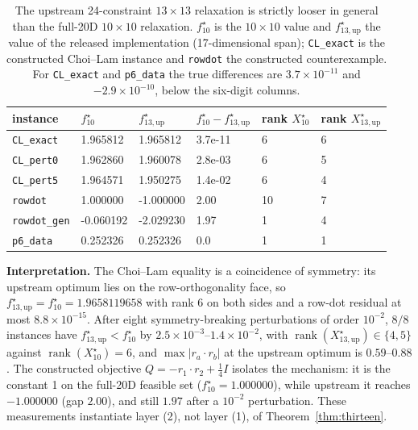 \begin{table}[t]
\centering
\caption{The upstream 24-constraint $13\times13$ relaxation is strictly looser in general than the full-20D $10\times10$ relaxation. $f^\star_{10}$ is the $10\times10$ value and $f^\star_{13,\mathrm{up}}$ the value of the released implementation (17-dimensional span); \texttt{CL\_exact} is the constructed Choi--Lam instance and \texttt{rowdot} the constructed counterexample. For \texttt{CL\_exact} and \texttt{p6\_data} the true differences are $3.7\times10^{-11}$ and $-2.9\times10^{-10}$, below the six-digit columns.}
\label{tab:13v10}
\footnotesize
\setlength{\tabcolsep}{6pt}
\begin{tabular}{@{}l l l l l l@{}}
\toprule
instance & $f^\star_{10}$ & $f^\star_{13,\mathrm{up}}$ & $f^\star_{10}-f^\star_{13,\mathrm{up}}$ & rank $X_{10}^\star$ & rank $X_{13,\mathrm{up}}^\star$\\
\midrule
\texttt{CL\_exact} & 1.965812 & 1.965812 & 3.7e-11 & 6 & 6\\
\texttt{CL\_pert0} & 1.962860 & 1.960078 & 2.8e-03 & 6 & 5\\
\texttt{CL\_pert5} & 1.964571 & 1.950275 & 1.4e-02 & 6 & 4\\
\texttt{rowdot} & 1.000000 & -1.000000 & 2.00 & 10 & 7\\
\texttt{rowdot\_gen} & -0.060192 & -2.029230 & 1.97 & 1 & 4\\
\texttt{p6\_data} & 0.252326 & 0.252326 & 0.0 & 1 & 1\\
\bottomrule
\end{tabular}
\end{table}

\textbf{Interpretation.} The Choi--Lam equality is a coincidence of symmetry: its upstream optimum lies on the row-orthogonality face, so $f^\star_{13,\mathrm{up}}=f^\star_{10}=1.9658119658$ with rank 6 on both sides and a row-dot residual at most $8.8\times10^{-15}$. After eight symmetry-breaking perturbations of order $10^{-2}$, $8/8$ instances have $f^\star_{13,\mathrm{up}}<f^\star_{10}$ by $2.5\times10^{-3}$--$1.4\times10^{-2}$, with $\operatorname{rank}(X^\star_{13,\mathrm{up}})\in\{4,5\}$ against $\operatorname{rank}(X^\star_{10})=6$, and $\max|r_a\cdot r_b|$ at the upstream optimum is $0.59$--$0.88$. The constructed objective $Q=-r_1\cdot r_2+\tfrac14I$ isolates the mechanism: it is the constant 1 on the full-20D feasible set ($f^\star_{10}=1.000000$), while upstream it reaches $-1.000000$ (gap $2.00$), and still $1.97$ after a $10^{-2}$ perturbation. These measurements instantiate layer (2), not layer (1), of Theorem~\ref{thm:thirteen}.

